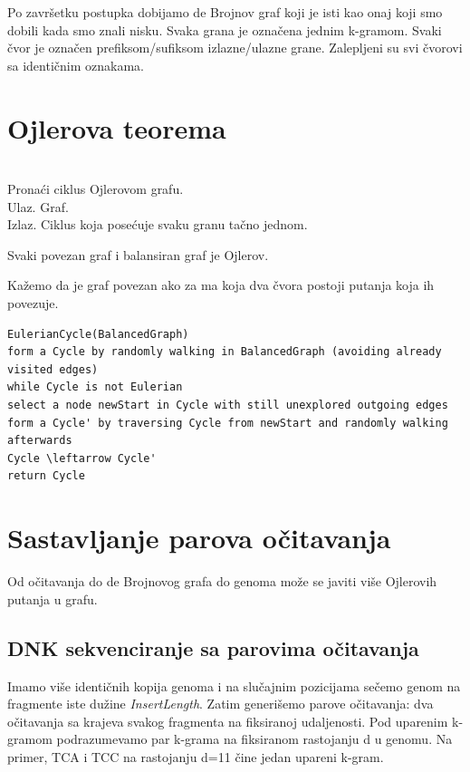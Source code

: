 Po završetku postupka dobijamo de Brojnov graf koji je isti kao onaj koji smo dobili kada smo znali nisku. Svaka grana je označena jednim k-gramom. Svaki čvor je označen prefiksom/sufiksom izlazne/ulazne grane. Zalepljeni su svi čvorovi sa identičnim oznakama.

\section{Ojlerova teorema}

\begin{problem}
	~\\ Pronaći ciklus Ojlerovom grafu.
	\\ Ulaz. Graf.
	\\ Izlaz. Ciklus koja posećuje svaku granu tačno jednom.
\end{problem}

\begin{teorema}
	Svaki povezan graf i balansiran graf je Ojlerov.
\end{teorema}

Kažemo da je graf povezan ako za ma koja dva čvora postoji putanja koja ih povezuje.



\begin{verbatim}
EulerianCycle(BalancedGraph)
form a Cycle by randomly walking in BalancedGraph (avoiding already visited edges)
while Cycle is not Eulerian
select a node newStart in Cycle with still unexplored outgoing edges
form a Cycle' by traversing Cycle from newStart and randomly walking afterwards
Cycle \leftarrow Cycle'
return Cycle
\end{verbatim}

\section{Sastavljanje parova očitavanja}

Od očitavanja do de Brojnovog grafa do genoma može se javiti više Ojlerovih putanja u grafu.

\subsection{DNK sekvenciranje sa parovima očitavanja} 

Imamo više identičnih kopija genoma i na slučajnim pozicijama sečemo genom na fragmente iste dužine \textit{InsertLength}. Zatim generišemo parove očitavanja: dva očitavanja sa krajeva svakog fragmenta na fiksiranoj udaljenosti.
Pod uparenim k-gramom podrazumevamo par k-grama na fiksiranom rastojanju d u genomu. Na primer, TCA i TCC na rastojanju d=11 čine jedan upareni k-gram.

